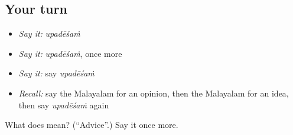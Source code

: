 \subsection*{Your turn}
\begin{itemize}
\raggedright
  \item \emph{Say it:} \emph{upadēśaṁ}
  \item \emph{Say it:} \emph{upadēśaṁ}, once more
  \item \emph{Say it:} say \emph{upadēśaṁ}
  \item \emph{Recall:} say the Malayalam for an opinion, then the Malayalam for an idea, then say \emph{upadēśaṁ} again
\end{itemize}

\begin{tcolorbox}[breakable,colback=teal!4,colframe=teal!35!black,title={Before you move on}]
What does  mean? (\textquotedblleft{}Advice\textquotedblright{}.) Say it once more.
\end{tcolorbox}
